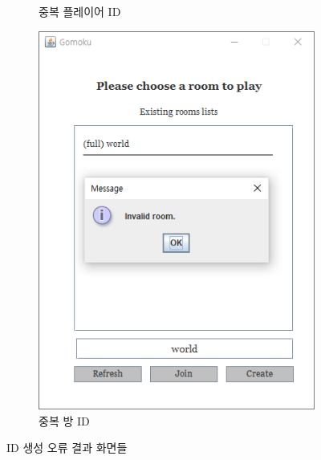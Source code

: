 \documentclass[a4paper, 10pt]{article}
\begin{document}
\begin{figure}[h]
\begin{subfigure}{.24\textwidth}
    \caption{중복 플레이어 ID}
    \label{fig:existing_playerID}
  \end{subfigure}
  \begin{subfigure}{.24\textwidth}
    \centering
    \includegraphics[width=.9\linewidth]{resource/existing_roomID}
    \caption{중복 방 ID}
    \label{fig:existing_roomID}
  \end{subfigure}
  \caption{ID 생성 오류 결과 화면들}
\end{figure}
\newpage
\end{document}
